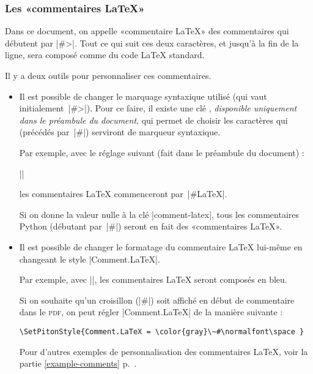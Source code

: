 \documentclass[dvipsnames,svgnames]{article}
\begin{document}
\subsubsection{Les «commentaires LaTeX»}


Dans ce document, on appelle «commentaire LaTeX» des commentaires qui débutent par |#>|.
Tout ce qui suit ces deux caractères, et jusqu'à la fin de la ligne, sera composé comme du
code LaTeX standard.

Il y a deux outils pour personnaliser ces commentaires.

\begin{itemize}
\item Il est possible de changer le marquage syntaxique utilisé (qui vaut
initialement~|#>|). Pour ce faire, il existe une clé ,
\emph{disponible uniquement dans le préambule du document}, qui permet de choisir les
caractères qui (précédés par~|#|) serviront de marqueur syntaxique.

Par exemple, avec le réglage suivant (fait dans le préambule du document) :

||

les commentaires LaTeX commenceront par~|#LaTeX|.

Si on donne la valeur nulle à la clé |comment-latex|, tous les commentaires Python
(débutant par~|#|) seront en fait des «commentaires LaTeX».

\smallskip
\item Il est possible de changer le formatage du commentaire LaTeX lui-même en changeant
le style  |Comment.LaTeX|.

Par exemple, avec ||, les
commentaires LaTeX seront composés en bleu.

Si on souhaite qu'un croisillon (|#|) soit affiché en début de commentaire dans le
\textsc{pdf}, on peut régler |Comment.LaTeX| de la manière suivante :

\begin{Verbatim}
\SetPitonStyle{Comment.LaTeX = \color{gray}\~#\normalfont\space }
\end{Verbatim}

Pour d'autres exemples de personnalisation des commentaires LaTeX, voir la partie \ref{example-comments}
p.~\pageref{example-comments}. 
\end{itemize}
\end{document}
